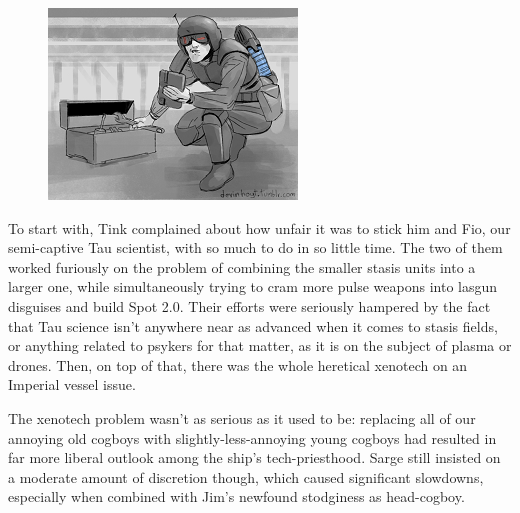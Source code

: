 \begin{figure}
	\begin{center}
		\includegraphics[width=\figwidth]{pics/12/7.png}
	\end{center}
\end{figure}
To start with, Tink complained about how unfair it was to stick him and Fio, our semi-captive Tau scientist, with so much to do in so little time. 
The two of them worked furiously on the problem of combining the smaller stasis units into a larger one, while simultaneously trying to cram more pulse weapons into lasgun disguises and build Spot 2.0. 
Their efforts were seriously hampered by the fact that Tau science isn't anywhere near as advanced when it comes to stasis fields, or anything related to psykers for that matter, as it is on the subject of plasma or drones. 
Then, on top of that, there was the whole heretical xenotech on an Imperial vessel issue.

The xenotech problem wasn't as serious as it used to be: 
replacing all of our annoying old cogboys with slightly-less-annoying young cogboys had resulted in far more liberal outlook among the ship's tech-priesthood. 
Sarge still insisted on a moderate amount of discretion though, which caused significant slowdowns, especially when combined with Jim's newfound stodginess as head-cogboy. 


